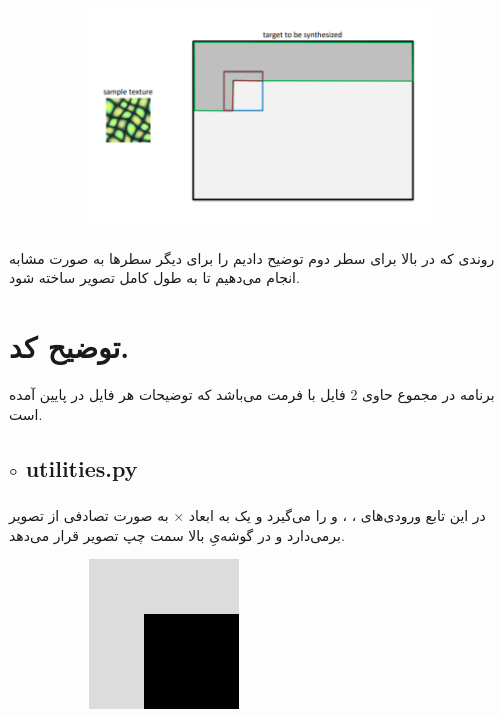 \documentclass[a4paper,12pt]{article}
\begin{document}
 \begin{figure}[H]
	\centering
	\begin{subfigure}{0.8\textwidth}
		\centering
		\includegraphics[width=.7\textwidth]{10.png}
	\end{subfigure}%
\end{figure}
روندی که در بالا برای سطر دوم توضیح دادیم را برای دیگر سطرها به صورت مشابه انجام می‌دهیم تا به طول کامل تصویر
ساخته شود.


\section*{توضیح کد.}
برنامه در مجموع حاوی 2 فایل با فرمت
می‌باشد که توضیحات هر فایل در پایین آمده است.
\subsection*{$\circ$ utilities.py}

\subsubsection*{}
در این تابع ورودی‌های
،
،
و
را می‌گیرد و یک 
به ابعاد  $ \times $ به صورت تصادفی از تصویر 
برمی‌دارد و در گوشه‌یِ بالا سمت چپ تصویر
قرار می‌دهد.

\begin{figure}[H]
\centering
\begin{subfigure}{0.8\textwidth}
	\centering
	\includegraphics[width=.4\textwidth]{18.jpg}
\end{subfigure}%
\end{figure}
\end{document}
